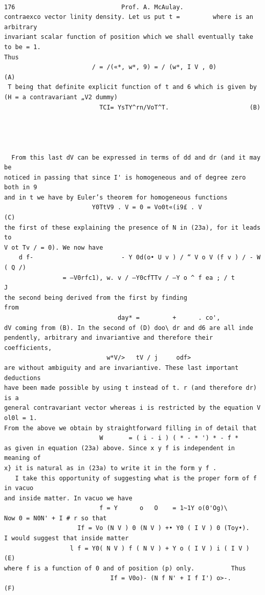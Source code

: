 \documentclass[10pt]{article}
\begin{document}
\begin{verbatim}

176                             Prof. A. McAulay.
contraexco vector linity density. Let us put t =         where is an arbitrary
invariant scalar function of position which we shall eventually take to be = 1.
Thus
                        / = /(«*, w*, 9) = / (w*, I V , 0)                  (A)
 T being that definite explicit function of t and 6 which is given by
(H = a contravariant „V2 dummy)
                          TCI= YsTY^rn/VoT^T.                      (B)




  From this last dV can be expressed in terms of dd and dr (and it may be
noticed in passing that since I' is homogeneous and of degree zero both in 9
and in t we have by Euler’s theorem for homogeneous functions
                        Y0TtV9 . V = 0 = Vo0t«(i9£ . V                              (C)
the first of these explaining the presence of N in (23a), for it leads to
V ot Tv / = 0). We now have
    d f-                        - Y 0d(o• U v ) / “ V o V (f v ) / - W    ( Q /)
                = —V0rfc1), w. v / —Y0cfTTv / —Y o ^ f ea ; / t           J
the second being derived from the first by finding                 from
                               day* =         +      . co',
dV coming from (B). In the second of (D) doo\ dr and d6 are all inde­
pendently, arbitrary and invariantive and therefore their coefficients,
                            w*V/>   tV / j     odf>
are without ambiguity and are invariantive. These last important deductions
have been made possible by using t instead of t. r (and therefore dr) is a
general contravariant vector whereas i is restricted by the equation V ol0l = 1.
From the above we obtain by straightforward filling in of detail that
                          W       = ( i - i ) ( * - * ') * - f *
as given in equation (23a) above. Since x y f is independent in meaning of
x} it is natural as in (23a) to write it in the form y f .
   I take this opportunity of suggesting what is the proper form of f in vacuo
and inside matter. In vacuo we have
                          f = Y      o   O    = 1~1Y o(0'Og)\
Now 0 = N0N' + I # r so that
                    If = Vo (N V ) 0 (N V ) +• Y0 ( I V ) 0 (Toy•).
I would suggest that inside matter
                  l f = Y0( N V ) f ( N V ) + Y o ( I V ) i ( I V )                (E)
where f is a function of 0 and of position (p) only.          Thus
                             If = V0o)- (N f N' + I f I') o>-.                     (F)


\end{verbatim}
\end{document}
